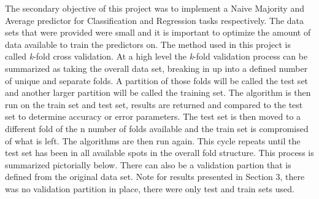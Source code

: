 \documentclass[twoside,11pt]{article}
\begin{document}
\newpage

\hspace*{10mm}The secondary objective of this project was to implement a Naive Majority and Average predictor for Classification and Regression tasks respectively. The data sets that were provided were small and it is important to optimize the amount of data available to train the predictors on. The method used in this project is called \textit{k}-fold cross validation. At a high level the \textit{k}-fold validation process can be summarized as taking the overall data set, breaking in up into a defined number of unique and separate folds. A partition of those folds will be called the test set and another larger partition will be called the training set. The algorithm is then run on the train set and test set, results are returned and compared to the test set to determine accuracy or error parameters. The test set is then moved to a different fold of the n number of folds available and the train set is compromised of what is left. The algorithms are then run again. This cycle repeats until the test set has been in all available spots in the overall fold structure. This process is summarized pictorially below. There can also be a validation partion that is defined from the original data set. Note for results presented in Section 3, there was no validation partition in place, there were only test and train sets used. \newline
\end{document}
